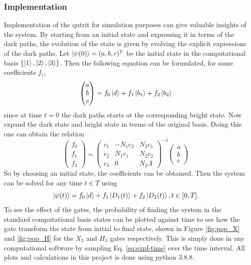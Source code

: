 \subsubsection{Implementation}
Implementation of the qutrit for simulation purposes can give valuable insights of the system. By starting from an initial state and expressing it in terms of the dark paths, the evolution of the state is given by evolving the explicit expressions of the dark paths. Let $\ket{\psi(0)} = (a,b,c)^T$ be the initial state in the computational basis $\{\ket{1},\ket{2},\ket{3}\}$. Then the following equation can be formulated, for some coefficients $f_i$,
\begin{equation}
\begin{pmatrix}
a\\
b\\
c
\end{pmatrix}
= f_0 \ket{d} + f_1\ket{b_1} + f_2\ket{b_2}
\end{equation}
since at time $t = 0$ the dark paths starts at the corresponding bright state.
Now expand the dark state and bright state in terms of the original basis. Doing this one can obtain the relation
\begin{equation}
\begin{pmatrix}
f_0\\
f_1\\
f_2
\end{pmatrix} = \begin{pmatrix}
c_1 & -N_1 c_2 & N_2 c_1
\\
c_2 & N_1 c_1 & N_2 c_2
\\
c_3 & 0 & N_2 \Lambda
\end{pmatrix}^{-1}\begin{pmatrix}
a\\
b\\
c
\end{pmatrix}
\end{equation}
So by choosing an initial state, the coefficients can be obtained.
Then the system can be solved for any time $t \in T$ using
\begin{equation}
\label{eq:expl-time}
\ket{\psi(t)} = f_0\ket{d} + f_1\ket{D_1(t)} + f_2\ket{D_2(t)}, t \in [0,T].
\end{equation}
To see the effect of the gates, the probability of finding the system in the standard computational basis states can be plotted against time to see how the gate transform the state from initial to final state, shown in Figure \ref{fig:pop_X} and \ref{fig:pop_H} for the $X_3$ and $H_3$ gates respectively. This is simply done in any computational software by sampling Eq. \ref{eq:expl-time} over the time interval. All plots and calculations in this project is done using python 3.8.8.  

